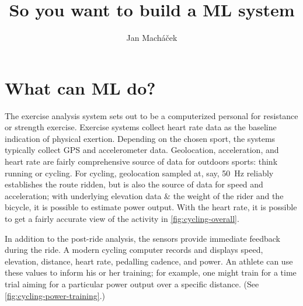 



\title{So you want to build a ML system}

\author{Jan Macháček}




\section{What can ML do?}
The exercise analysis system sets out to be a computerized personal for resistance or strength exercise. Exercise systems collect heart rate data as the baseline indication of physical exertion. Depending on the chosen sport, the systems typically collect GPS and accelerometer data. Geolocation, acceleration, and heart rate are fairly comprehensive source of data for outdoors sports: think running or cycling. For cycling, geolocation sampled at, say, \SI{50}{\hertz} reliably establishes the route ridden, but is also the source of data for speed and acceleration; with underlying elevation data \& the weight of the rider and the bicycle, it is possible to estimate power output. With the heart rate, it is possible to get a  fairly accurate view of the activity in \autoref{fig:cycling-overall}.


In addition to the post-ride analysis, the sensors provide immediate feedback during the ride. A modern cycling computer records and displays speed, elevation, distance, heart rate, pedalling cadence, and power. An athlete can use these values to inform his or her training; for example, one might train for a time trial aiming for a particular power output over a specific distance. (See \autoref{fig:cycling-power-training}.)


